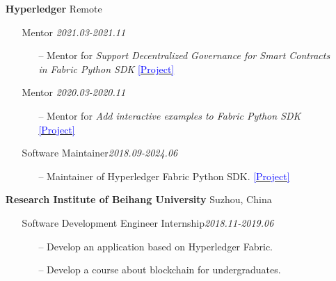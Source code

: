 \documentclass[11pt]{article}
\begin{document}
\begin{itemize}[leftmargin=0em, noitemsep, nolistsep]
    \item[] \large\textbf{Hyperledger} \hfill Remote
        \begin{itemize}[noitemsep, nolistsep, leftmargin=0em]
            \item[] Mentor \hfill \textit{2021.03-2021.11}
            \begin{itemize}
                \small
                \item[--] Mentor for \textit{Support Decentralized Governance for Smart Contracts in Fabric Python SDK} \href{https://wiki.hyperledger.org/display/INTERN/Support+Decentralized+Governance+for+Smart+Contracts+in+Fabric+Python+SDK}{\textcolor{blue}{[Project]}}
            \end{itemize}
            \item[] Mentor \hfill \textit{2020.03-2020.11}
            \begin{itemize}
                \small
                \item[--] Mentor for \textit{Add interactive examples to Fabric Python SDK} \href{https://wiki.hyperledger.org/pages/viewpage.action?pageId=29035315}{\textcolor{blue}{[Project]}}
            \end{itemize}
            \item[] Software Maintainer\hfill \textit{2018.09-2024.06}
             \begin{itemize}
                \small
                \item[--] Maintainer of Hyperledger Fabric Python SDK. \href{https://github.com/hyperledger/fabric-sdk-py}{\textcolor{blue}{[Project]}}
             \end{itemize}
        \end{itemize} 

    \item[] \large\textbf{Research Institute of Beihang University} \hfill Suzhou, China
        \begin{itemize}[noitemsep, nolistsep, leftmargin=0em]
            \item[] Software Development Engineer Internship\hfill \textit{2018.11-2019.06}
             \begin{itemize}
                \small
                \item[--] Develop an application based on Hyperledger Fabric.
                \item[--] Develop a course about blockchain for undergraduates.
             \end{itemize}
        \end{itemize}
\end{itemize}
\vspace{20mm} %
\end{document}
